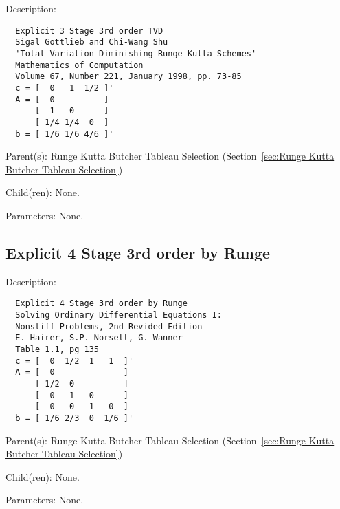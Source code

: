 \begin{list}{}
  {\setlength{\leftmargin}{1.0in}
   \setlength{\labelwidth}{0.75in}
   \setlength{\labelsep}{0.125in}}
  \item[Description:]
\begin{verbatim}
  Explicit 3 Stage 3rd order TVD
  Sigal Gottlieb and Chi-Wang Shu
  'Total Variation Diminishing Runge-Kutta Schemes'
  Mathematics of Computation
  Volume 67, Number 221, January 1998, pp. 73-85
  c = [  0   1  1/2 ]'
  A = [  0          ]
      [  1   0      ]
      [ 1/4 1/4  0  ]
  b = [ 1/6 1/6 4/6 ]'
\end{verbatim}
  \item[Parent(s):]
    Runge Kutta Butcher Tableau Selection (Section~\ref{sec:Runge Kutta Butcher Tableau Selection})
  \item[Child(ren):]
    None. 
  \item[Parameters:]
    None. 
\end{list}

\subsection{Explicit 4 Stage 3rd order by Runge}
\label{sec:Explicit 4 Stage 3rd order by Runge}

\begin{list}{}
  {\setlength{\leftmargin}{1.0in}
   \setlength{\labelwidth}{0.75in}
   \setlength{\labelsep}{0.125in}}
  \item[Description:]
\begin{verbatim}
  Explicit 4 Stage 3rd order by Runge
  Solving Ordinary Differential Equations I:
  Nonstiff Problems, 2nd Revided Edition
  E. Hairer, S.P. Norsett, G. Wanner
  Table 1.1, pg 135
  c = [  0  1/2  1   1  ]'
  A = [  0              ]
      [ 1/2  0          ]
      [  0   1   0      ]
      [  0   0   1   0  ]
  b = [ 1/6 2/3  0  1/6 ]'
\end{verbatim}
  \item[Parent(s):]
    Runge Kutta Butcher Tableau Selection (Section~\ref{sec:Runge Kutta Butcher Tableau Selection})
  \item[Child(ren):]
    None. 
  \item[Parameters:]
    None. 
\end{list}

